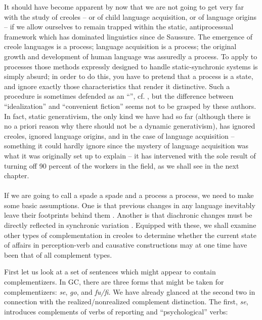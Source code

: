 It should have become apparent by now that we are not going to get very far with the study of creoles -- or of child language acquisition, or of language origins -- if we allow ourselves to remain trapped within the static, antiprocessual framework which has dominated linguistics since de Saussure. The emergence of creole languages is a process; language acquisition is a process; the original growth and development of human language was assuredly a process. To apply to processes those methods expressly designed to handle static-synchronic systems is simply absurd; in order to do this, you have to pretend that a process
is a state, and ignore exactly those characteristics that render it distinc\-tive. Such a procedure is sometimes defended as an ``'', cf. \citet[Chapter 8]{ChomskyEtAl1968}, but the difference between ``idealization'' and ``convenient fiction'' seems not to be grasped by these authors. In fact, static generativism, the only kind we have had so far (although there is no a priori reason why there should not be a dynamic generativism), has ignored creoles, ignored language origins, and in the case of language acquisition -- something it could hardly ignore since the mystery of language acquisition was what it was originally set up to explain -- it has intervened with the sole result of turning off 90 percent of the workers in the field, as we shall see in the next chapter.\\\\

If we are going to call a spade a spade and a process a process, we need to make some basic assumptions. One is that previous changes in any language inevitably leave their footprints behind them \citep{Givón1971}. Another is that diachronic changes must be directly reflected in synchronic variation \citep{WeinreichEtAl1968,Bickerton1975,Bailey1973}. Equipped with these, we shall examine other types of complementation in creoles to determine whether the current state of affairs in perception-verb and causative constructions may at one time have been that of all complement types.

First let us look at a set of sentences which might appear to contain complementizers. In GC, there are three forms that might be taken for complementizers: \textit{se}, \textit{go}, and \textit{fu/fi.} We have already glanced at the second two in connection with the realized/nonrealized com\-plement distinction. The first, \textit{se}, introduces complements of verbs of reporting and ``psychological'' verbs:

